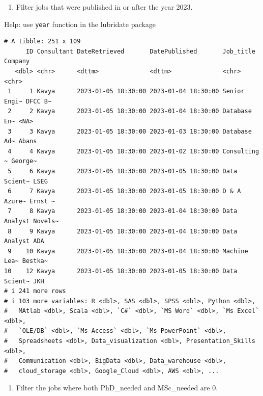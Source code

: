 \documentclass[
  letterpaper,
  DIV=11,
  numbers=noendperiod]{scrreprt}
\providecommand{\tightlist}{%
  \setlength{\itemsep}{0pt}\setlength{\parskip}{0pt}}\usepackage{longtable,booktabs,array}
\begin{document}
\begin{enumerate}
\def\labelenumi{\arabic{enumi}.}
\setcounter{enumi}{8}
\tightlist
\item
  Filter jobs that were published in or after the year 2023.
\end{enumerate}

Help: use \texttt{year} function in the lubridate package

\begin{verbatim}
# A tibble: 251 x 109
      ID Consultant DateRetrieved       DatePublished       Job_title    Company
   <dbl> <chr>      <dttm>              <dttm>              <chr>        <chr>  
 1     1 Kavya      2023-01-05 18:30:00 2023-01-04 18:30:00 Senior Engi~ DFCC B~
 2     2 Kavya      2023-01-05 18:30:00 2023-01-04 18:30:00 Database En~ <NA>   
 3     3 Kavya      2023-01-05 18:30:00 2023-01-03 18:30:00 Database Ad~ Abans  
 4     4 Kavya      2023-01-05 18:30:00 2023-01-02 18:30:00 Consulting ~ George~
 5     6 Kavya      2023-01-05 18:30:00 2023-01-05 18:30:00 Data Scient~ LSEG   
 6     7 Kavya      2023-01-05 18:30:00 2023-01-05 18:30:00 D & A Azure~ Ernst ~
 7     8 Kavya      2023-01-05 18:30:00 2023-01-04 18:30:00 Data Analyst Novels~
 8     9 Kavya      2023-01-05 18:30:00 2023-01-04 18:30:00 Data Analyst ADA    
 9    10 Kavya      2023-01-05 18:30:00 2023-01-04 18:30:00 Machine Lea~ Bestka~
10    12 Kavya      2023-01-05 18:30:00 2023-01-05 18:30:00 Data Scient~ JKH    
# i 241 more rows
# i 103 more variables: R <dbl>, SAS <dbl>, SPSS <dbl>, Python <dbl>,
#   MAtlab <dbl>, Scala <dbl>, `C#` <dbl>, `MS Word` <dbl>, `Ms Excel` <dbl>,
#   `OLE/DB` <dbl>, `Ms Access` <dbl>, `Ms PowerPoint` <dbl>,
#   Spreadsheets <dbl>, Data_visualization <dbl>, Presentation_Skills <dbl>,
#   Communication <dbl>, BigData <dbl>, Data_warehouse <dbl>,
#   cloud_storage <dbl>, Google_Cloud <dbl>, AWS <dbl>, ...
\end{verbatim}

\begin{enumerate}
\def\labelenumi{\arabic{enumi}.}
\setcounter{enumi}{9}
\tightlist
\item
  Filter the jobs where both PhD\_needed and MSc\_needed are 0.
\end{enumerate}
\end{document}
